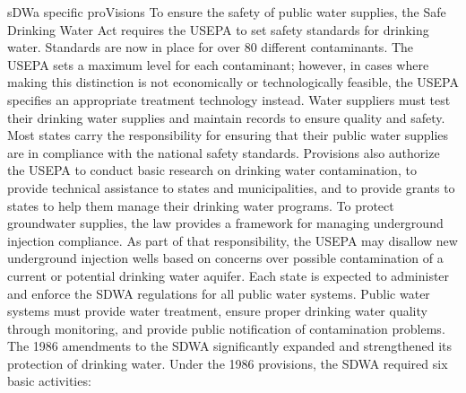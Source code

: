 \documentclass{article}
\begin{document}
sDWa specific proVisions To ensure the safety of public water supplies,
the Safe Drinking Water Act requires the USEPA to set safety standards
for drinking water. Standards are now in place for over 80 different
contaminants. The USEPA sets a maximum level for each contaminant;
however, in cases where making this distinction is not economically or
technologically feasible, the USEPA specifies an appropriate treatment
technology instead. Water suppliers must test their drinking water
supplies and maintain records to ensure quality and safety. Most states
carry the responsibility for ensuring that their public water supplies
are in compliance with the national safety standards. Provisions also
authorize the USEPA to conduct basic research on drinking water
contamination, to provide technical assistance to states and
municipalities, and to provide grants to states to help them manage
their drinking water programs. To protect groundwater supplies, the law
provides a framework for managing underground injection compliance. As
part of that responsibility, the USEPA may disallow new underground
injection wells based on concerns over possible contamination of a
current or potential drinking water aquifer. Each state is expected to
administer and enforce the SDWA regulations for all public water
systems. Public water systems must provide water treatment, ensure
proper drinking water quality through monitoring, and provide public
notification of contamination problems. The 1986 amendments to the SDWA
significantly expanded and strengthened its protection of drinking
water. Under the 1986 provisions, the SDWA required six basic
activities:
\end{document}
